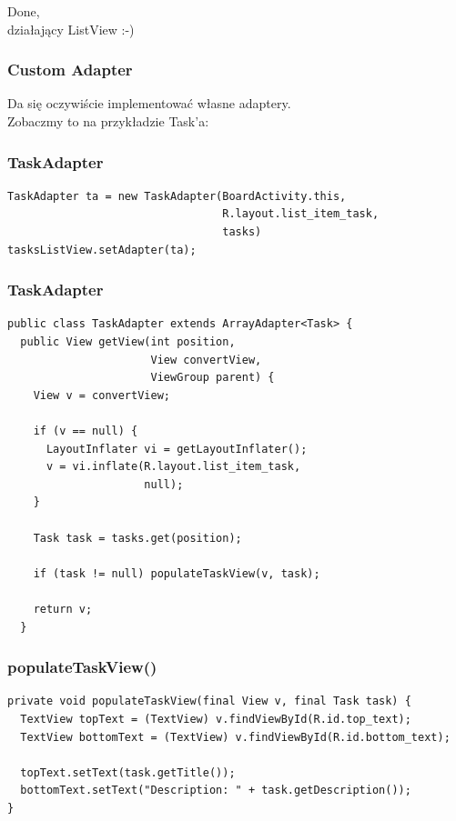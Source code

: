 \begin{frame}
 \begin{center}
  Done, \\ 
  działający ListView :-)
 \end{center}
\end{frame}

\begin{frame}\frametitle{Custom Adapter}
 \begin{center}
  \large{Da się oczywiście implementować własne adaptery.\\
  Zobaczmy to na przykładzie Task'a:}
 \end{center}
\end{frame}

\begin{frame}[fragile]\frametitle{TaskAdapter}
\begin{lstlisting}
TaskAdapter ta = new TaskAdapter(BoardActivity.this, 
                                 R.layout.list_item_task, 
                                 tasks)
tasksListView.setAdapter(ta);
\end{lstlisting}
\end{frame}


\begin{frame}[fragile]\frametitle{TaskAdapter}
\begin{lstlisting}
public class TaskAdapter extends ArrayAdapter<Task> {
  public View getView(int position, 
                      View convertView, 
                      ViewGroup parent) {
    View v = convertView;

    if (v == null) {
      LayoutInflater vi = getLayoutInflater();
      v = vi.inflate(R.layout.list_item_task, 
                     null);
    }

    Task task = tasks.get(position);

    if (task != null) populateTaskView(v, task);

    return v;
  }
\end{lstlisting}
\end{frame}

\begin{frame}[fragile]\frametitle{populateTaskView()}
\begin{lstlisting}
private void populateTaskView(final View v, final Task task) {
  TextView topText = (TextView) v.findViewById(R.id.top_text);
  TextView bottomText = (TextView) v.findViewById(R.id.bottom_text);

  topText.setText(task.getTitle());
  bottomText.setText("Description: " + task.getDescription());
}
\end{lstlisting}

\end{frame}



